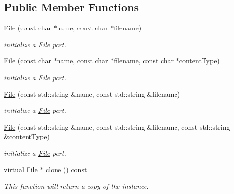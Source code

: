 \subsection*{Public Member Functions}
\begin{DoxyCompactItemize}
\item 
\hyperlink{classcurlpp_1_1FormParts_1_1File_a279297fcb9d6f362d432d22363107812}{File} (const char $\ast$name, const char $\ast$filename)
\begin{DoxyCompactList}\small\item\em initialize a \hyperlink{classcurlpp_1_1FormParts_1_1File}{File} part. \end{DoxyCompactList}\item 
\hyperlink{classcurlpp_1_1FormParts_1_1File_a7fd7447d8a4df5d9533ebeb5f3790235}{File} (const char $\ast$name, const char $\ast$filename, const char $\ast$content\-Type)
\begin{DoxyCompactList}\small\item\em initialize a \hyperlink{classcurlpp_1_1FormParts_1_1File}{File} part. \end{DoxyCompactList}\item 
\hyperlink{classcurlpp_1_1FormParts_1_1File_af9054c6b96d284b1ef6dd086b9122b51}{File} (const std\-::string \&name, const std\-::string \&filename)
\begin{DoxyCompactList}\small\item\em initialize a \hyperlink{classcurlpp_1_1FormParts_1_1File}{File} part. \end{DoxyCompactList}\item 
\hyperlink{classcurlpp_1_1FormParts_1_1File_ac961a43be0e8f224f06f71f83bff31fd}{File} (const std\-::string \&name, const std\-::string \&filename, const std\-::string \&content\-Type)
\begin{DoxyCompactList}\small\item\em initialize a \hyperlink{classcurlpp_1_1FormParts_1_1File}{File} part. \end{DoxyCompactList}\item 
\hypertarget{classcurlpp_1_1FormParts_1_1File_ac4917a83ae6f0d039a0e788e0b6c4db8}{virtual \hyperlink{classcurlpp_1_1FormParts_1_1File}{File} $\ast$ \hyperlink{classcurlpp_1_1FormParts_1_1File_ac4917a83ae6f0d039a0e788e0b6c4db8}{clone} () const }\label{classcurlpp_1_1FormParts_1_1File_ac4917a83ae6f0d039a0e788e0b6c4db8}

\begin{DoxyCompactList}\small\item\em This function will return a copy of the instance. \end{DoxyCompactList}\end{DoxyCompactItemize}
